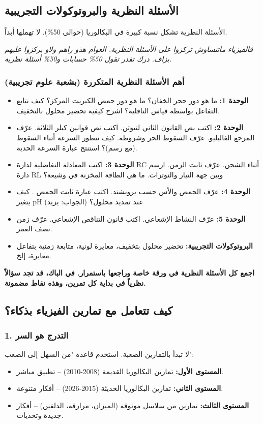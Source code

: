 \documentclass[12pt,a4paper]{book}
\newcommand{\quoteAr}[1]{%
	\begin{myquote}
		\itshape #1
	\end{myquote}
}
\newcommand{\importantAr}[1]{%
	\begin{important}
		\bfseries #1
	\end{important}
}
\begin{document}
	\subsection{الأسئلة النظرية والبروتوكولات التجريبية  }
	الأسئلة النظرية تشكل نسبة كبيرة في البكالوريا (حوالي 50\%). لا تهملها أبداً.
	
	\quoteAr{فالفيزياء ماتنساوش تركزوا على الأسئلة النظرية. العوام هذو راهم ولاو يركزوا عليهم بزاف. درك تقدر تقول 50\% حسابات و50\% أسئلة نظرية.}
	
	\subsubsection*{أهم الأسئلة النظرية المتكررة (بشعبة علوم تجريبية)}
	\begin{itemize}
		\item \textbf{الوحدة 1:} ما هو دور حجر الخفان؟ ما هو دور حمض الكبريت المركز؟ كيف نتابع التفاعل بواسطة قياس الناقلية؟ اشرح كيفية تحضير محلول بالتخفيف.
		\item \textbf{الوحدة 2:} اكتب نص القانون الثاني لنيوتن. اكتب نص قوانين كبلر الثلاثة. عرّف المرجع الغاليليو. عرّف السقوط الحر وشروطه. كيف تتطور السرعة أثناء السقوط (مع رسم)؟ استنتج عبارة السرعة الحدية.
		\item \textbf{الوحدة 3:} اكتب المعادلة التفاضلية لدارة RC أثناء الشحن. عرّف ثابت الزمن. ارسم دارة RL وبين جهة التيار والتوترات. ما هي الطاقة المخزنة في وشيعة؟
		\item \textbf{الوحدة 4:} عرّف الحمض والأس حسب برونشتد. اكتب عبارة ثابت الحمض . كيف يتغير pH عند تمديد محلول؟ (الجواب: يزيد)
		\item \textbf{الوحدة 5:} عرّف النشاط الإشعاعي. اكتب قانون التناقص الإشعاعي. عرّف زمن نصف العمر.
		\item \textbf{البروتوكولات التجريبية:} تحضير محلول بتخفيف، معايرة لونية، متابعة زمنية بتفاعل معايرة، إلخ.
	\end{itemize}
	
	\importantAr{اجمع كل الأسئلة النظرية في ورقة خاصة وراجعها باستمرار. \newline في الباك، قد تجد سؤالاً نظرياً في بداية كل تمرين، وهذه نقاط مضمونة.}
	
	\subsection{كيف تتعامل مع تمارين الفيزياء بذكاء؟}
	
	\subsubsection*{1. التدرج هو السر}
	لا تبدأ بالتمارين الصعبة. استخدم قاعدة "من السهل إلى الصعب":
	\begin{itemize}
		\item \textbf{المستوى الأول:} تمارين البكالوريا القديمة (2008-2010) – تطبيق مباشر.
		\item \textbf{المستوى الثاني:} تمارين البكالوريا الحديثة (2015-2026) – أفكار متنوعة.
		\item \textbf{المستوى الثالث:} تمارين من سلاسل موثوقة (الميزان، مرازقة، الدلفين) – أفكار جديدة وتحديات.
	\end{itemize}
	
\end{document}
